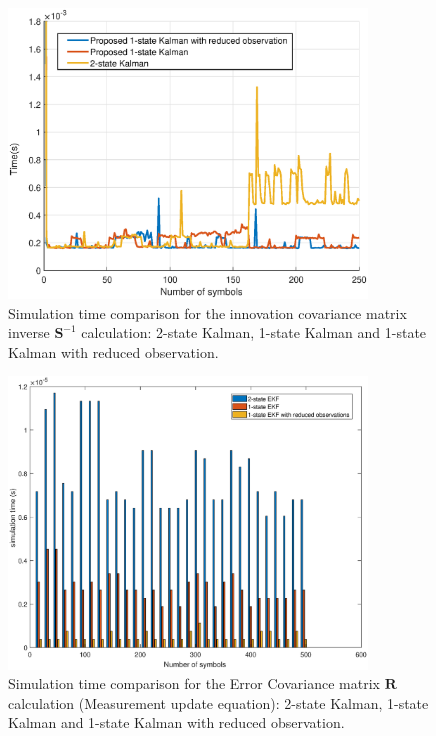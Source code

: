 \begin{figure}
	\includegraphics[width=0.85\textwidth]{figures/fig_red_kalman/Fig6bis.eps}
	\caption{Simulation time comparison for the innovation covariance matrix inverse $\boldsymbol{S}^{-1}$ calculation: 2-state Kalman, 1-state Kalman and 1-state Kalman with reduced observation.}
	\label{fig6}      
\end{figure}

\begin{figure}
	\includegraphics[width=0.85\textwidth]{figures/fig_red_kalman/Fig8.eps}
	\caption{Simulation time comparison for the Error Covariance matrix $\mathbf{R}$ calculation (Measurement update equation): 2-state Kalman, 1-state Kalman and 1-state Kalman with reduced observation.} 
	\label{fig8}      
\end{figure}


